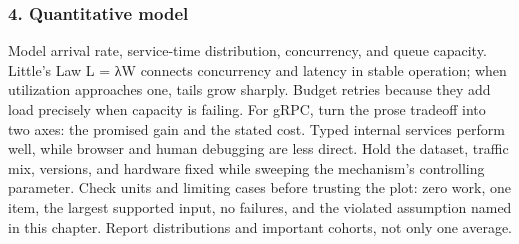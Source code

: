 \subsubsection*{4. Quantitative model}
Model arrival rate, service-time distribution, concurrency, and queue capacity. Little's Law L = λW connects concurrency and latency in stable operation; when utilization approaches one, tails grow sharply. Budget retries because they add load precisely when capacity is failing.
For gRPC, turn the prose tradeoff into two axes: the promised gain and the stated cost. Typed internal services perform well, while browser and human debugging are less direct. Hold the dataset, traffic mix, versions, and hardware fixed while sweeping the mechanism's controlling parameter.
Check units and limiting cases before trusting the plot: zero work, one item, the largest supported input, no failures, and the violated assumption named in this chapter. Report distributions and important cohorts, not only one average.
